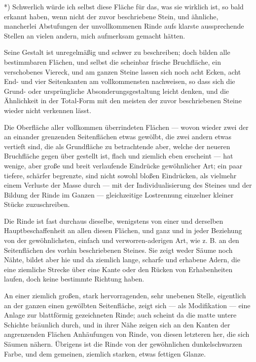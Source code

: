 \documentclass[a4paper, 11pt, oneside, german]{article}
\begin{document}
*) Schwerlich würde ich selbst diese Fläche für das, was sie wirklich ist, so bald erkannt haben, wenn nicht der zuvor beschriebene Stein, und ähnliche, mancherlei Abstufungen der unvollkommenen Rinde aufs klarste aussprechende Stellen an vielen andern, mich aufmerksam gemacht hätten.

Seine Gestalt ist unregelmäßig und schwer zu beschreiben; doch bilden alle bestimmbaren Flächen, und selbst die scheinbar frische Bruchfläche, ein verschobenes Viereck, und am ganzen Steine lassen sich noch acht Ecken, acht End- und vier Seitenkanten am vollkommensten nachweisen, so dass sich die Grund- oder ursprüngliche Absonderungsgestaltung leicht denken, und die Ähnlichkeit in der Total-Form mit den meisten der zuvor beschriebenen Steine wieder nicht verkennen lässt.

Die Oberfläche aller vollkommen überrindeten Flächen --- wovon wieder zwei der an einander grenzenden Seitenflächen etwas gewölbt, die zwei andern etwas vertieft sind, die als Grundfläche zu betrachtende aber, welche der neueren Bruchfläche gegen über gestellt ist, flach und ziemlich eben erscheint --- hat wenige, aber große und breit verlaufende Eindrücke gewöhnlicher Art; ein paar tiefere, schärfer begrenzte, sind nicht sowohl bloßen Eindrücken, als vielmehr einem Verluste der Masse durch --- mit der Individualisierung des Steines und der Bildung der Rinde im Ganzen --- gleichzeitige Lostrennung einzelner kleiner Stücke zuzuschreiben.

Die Rinde ist fast durchaus dieselbe, wenigstens von einer und derselben Hauptbeschaffenheit an allen diesen Flächen, und ganz und in jeder Beziehung von der gewöhnlichsten, einfach und verworren-aderigen Art, wie z. B. an den Seitenflächen des vorhin beschriebenen Steines. Sie zeigt weder Säume noch Nähte, bildet aber hie und da ziemlich lange, scharfe und erhabene Adern, die eine ziemliche Strecke über eine Kante oder den Rücken von Erhabenheiten laufen, doch keine bestimmte Richtung haben.

An einer ziemlich großen, stark hervorragenden, sehr unebenen Stelle, eigentlich an der ganzen einen gewölbten Seitenfläche, zeigt sich --- als Modifikation --- eine Anlage zur blattförmig gezeichneten Rinde; auch scheint da die matte untere Schichte bräunlich durch, und in ihrer Nähe zeigen sich an den Kanten der angrenzenden Flächen Anhäufungen von Rinde, von diesen letzteren her, die sich Säumen nähern. Übrigens ist die Rinde von der gewöhnlichen dunkelschwarzen Farbe, und dem gemeinen, ziemlich starken, etwas fettigen Glanze.
\end{document}
